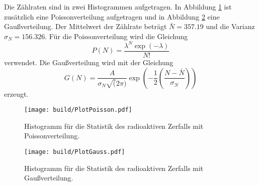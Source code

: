 \noindent Die Zählraten sind in zwei Histogrammen aufgetragen.
In Abbildung \ref{fig:pos} ist zusätzlich eine Poissonverteilung aufgetragen und in Abbildung \ref{fig:gauß} eine Gaußverteilung.
Der Mittelwert der Zählrate beträgt $\bar{N}= 357.19$ und die Varianz $\sigma_N = 156.326$.
Für die Poissonverteilung wird die Gleichung
\begin{equation}
  P(N)=\frac{\lambda^N \exp(-\lambda)}{N!}
\end{equation}
verwendet.
Die Gaußverteilung wird mit der Gleichung
\begin{equation}
  G(N) = \frac{A}{\sigma_N \sqrt(2\pi)} \exp(-\frac{1}{2}(\frac{N-\bar{N}}{\sigma_N}))
\end{equation}
erzeugt.
\begin{figure}[H]
  \centering
  \texttt{[image: build/PlotPoisson.pdf]}
  \caption{Histogramm für die Statistik des radioaktiven Zerfalls mit Poissonverteilung.}
  \label{fig:pos}
\end{figure}
\begin{figure}[H]
  \centering
  \texttt{[image: build/PlotGauss.pdf]}
  \caption{Histogramm für die Statistik des radioaktiven Zerfalls mit Gaußverteilung.}
  \label{fig:gauß}
\end{figure}

